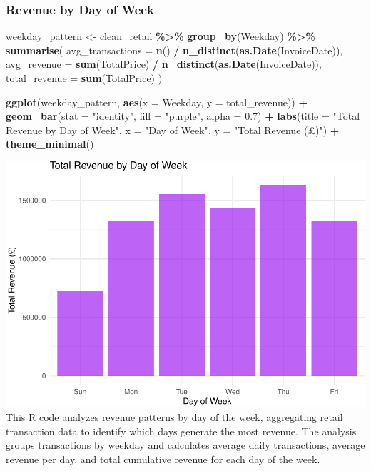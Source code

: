 \documentclass[
]{article}
\newenvironment{Shaded}{\begin{snugshade}}{\end{snugshade}}
\newcommand{\AttributeTok}[1]{\textcolor[rgb]{0.13,0.29,0.53}{#1}}
\newcommand{\FloatTok}[1]{\textcolor[rgb]{0.00,0.00,0.81}{#1}}
\newcommand{\FunctionTok}[1]{\textcolor[rgb]{0.13,0.29,0.53}{\textbf{#1}}}
\newcommand{\NormalTok}[1]{#1}
\newcommand{\OtherTok}[1]{\textcolor[rgb]{0.56,0.35,0.01}{#1}}
\newcommand{\SpecialCharTok}[1]{\textcolor[rgb]{0.81,0.36,0.00}{\textbf{#1}}}
\newcommand{\StringTok}[1]{\textcolor[rgb]{0.31,0.60,0.02}{#1}}
\begin{document}
\subsubsection{Revenue by Day of Week}\label{revenue-by-day-of-week}

\begin{Shaded}
\begin{Highlighting}[]
\NormalTok{weekday\_pattern }\OtherTok{\textless{}{-}}\NormalTok{ clean\_retail }\SpecialCharTok{\%\textgreater{}\%}
  \FunctionTok{group\_by}\NormalTok{(Weekday) }\SpecialCharTok{\%\textgreater{}\%}
  \FunctionTok{summarise}\NormalTok{(}
    \AttributeTok{avg\_transactions =} \FunctionTok{n}\NormalTok{() }\SpecialCharTok{/} \FunctionTok{n\_distinct}\NormalTok{(}\FunctionTok{as.Date}\NormalTok{(InvoiceDate)),}
    \AttributeTok{avg\_revenue =} \FunctionTok{sum}\NormalTok{(TotalPrice) }\SpecialCharTok{/} \FunctionTok{n\_distinct}\NormalTok{(}\FunctionTok{as.Date}\NormalTok{(InvoiceDate)),}
    \AttributeTok{total\_revenue =} \FunctionTok{sum}\NormalTok{(TotalPrice)}
\NormalTok{  )}

\FunctionTok{ggplot}\NormalTok{(weekday\_pattern, }\FunctionTok{aes}\NormalTok{(}\AttributeTok{x =}\NormalTok{ Weekday, }\AttributeTok{y =}\NormalTok{ total\_revenue)) }\SpecialCharTok{+}
  \FunctionTok{geom\_bar}\NormalTok{(}\AttributeTok{stat =} \StringTok{"identity"}\NormalTok{, }\AttributeTok{fill =} \StringTok{"purple"}\NormalTok{, }\AttributeTok{alpha =} \FloatTok{0.7}\NormalTok{) }\SpecialCharTok{+}
  \FunctionTok{labs}\NormalTok{(}\AttributeTok{title =} \StringTok{"Total Revenue by Day of Week"}\NormalTok{, }\AttributeTok{x =} \StringTok{"Day of Week"}\NormalTok{, }\AttributeTok{y =} \StringTok{"Total Revenue (£)"}\NormalTok{) }\SpecialCharTok{+}
  \FunctionTok{theme\_minimal}\NormalTok{()}
\end{Highlighting}
\end{Shaded}

\includegraphics{capstone_customer_segmentation_files/figure-latex/exploratory-data-analysis7-1.pdf}
This R code analyzes revenue patterns by day of the week, aggregating
retail transaction data to identify which days generate the most
revenue. The analysis groups transactions by weekday and calculates
average daily transactions, average revenue per day, and total
cumulative revenue for each day of the week.
\end{document}
